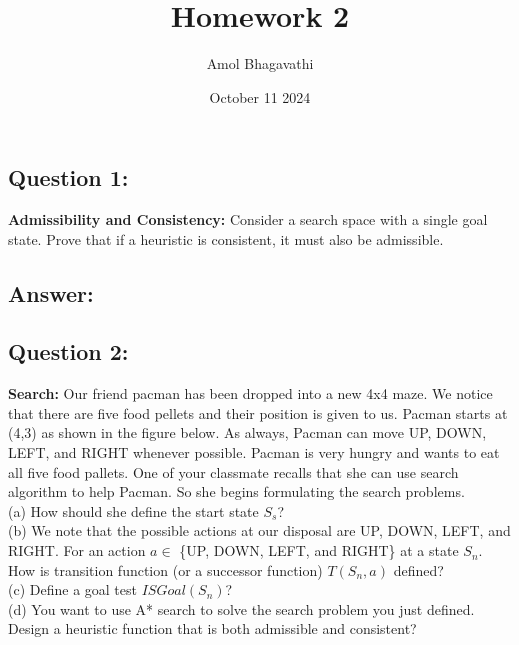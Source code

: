 \documentclass{article}
\title{Homework 2}
\author{Amol Bhagavathi}
\date{October 11 2024}
\begin{document}
\maketitle

\subsection*{Question 1:}
\textbf{Admissibility and Consistency:} Consider a search space with a single goal state. Prove that if a heuristic is consistent, it must also be admissible.
\subsection*{Answer:}

\subsection*{Question 2:}
\textbf{Search:} Our friend pacman has been dropped into a new 4x4 maze. We notice that there are five food pellets and their position is given to us. Pacman starts at (4,3) as shown in the figure below. As always, Pacman can move UP, DOWN, LEFT, and RIGHT whenever possible. Pacman is very hungry and wants to eat all five food pallets. One of your classmate recalls that she can use search algorithm to help Pacman. So she begins formulating the search problems.
\\
(a) How should she define the start state $S_s$?
\\
(b) We note that the possible actions at our disposal are UP, DOWN, LEFT, and RIGHT. For an action $a \in$ \{UP, DOWN, LEFT, and RIGHT\} at a state $S_n$. How is transition function (or a successor function) $T(S_n, a)$ defined?
\\
(c) Define a goal test $ISGoal(S_n)$?
\\
(d) You want to use A* search to solve the search problem you just defined. Design a heuristic function that is both admissible and consistent?
\end{document}
